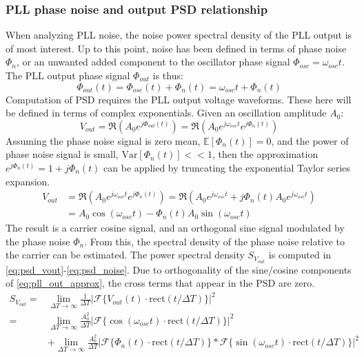 	\subsubsection{PLL phase noise and output PSD relationship}\label{pn_noise_psd}
		When analyzing PLL noise, the noise power spectral density of the PLL output is of most interest. Up to this point, noise has been defined in terms of phase noise $\Phi_{n}$, or an unwanted added component to the oscillator phase signal $\Phi_{osc}=\omega_{osc}t$. The PLL output phase signal $\Phi_{out}$ is thus:
		\begin{equation}
			\Phi_{out}(t) = \Phi_{osc}(t) + \Phi_{n}(t) = \omega_{osc}t + \Phi_{n}(t) 
		\end{equation}
		Computation of PSD requires the PLL output voltage waveforms. These here will be defined in terms of complex exponentials. Given an oscillation amplitude $A_0$:
		\begin{equation}
			V_{out} = \Re\left(A_0e^{j\Phi_{out}(t)}\right) = \Re\left(A_0e^{j\omega_{osc}t}e^{j\Phi_{n}(t)}\right)
		\end{equation}
		Assuming the phase noise signal is zero mean, $\mathbb{E}[\Phi_{n}(t)]=0$, and the power of phase noise signal is small, $\mathrm{Var}[\Phi_{n}(t)] << 1$, then the approximation $e^{j\Phi_{n}(t)} = 1 + j\Phi_{n}(t)$ can be applied by truncating the exponential Taylor series expansion.
		\begin{align}
			V_{out} &= \Re\left(A_0e^{j\omega_{osc}t}e^{j\Phi_{n}(t)}\right) = \Re\left(A_0e^{j\omega_{osc}t} +j\Phi_{n}(t)A_0e^{j\omega_{osc}t}\right)\\
			&= A_0\cos(\omega_{osc}t) - \Phi_{n}(t)A_0\sin(\omega_{osc}t) \label{eq:pll_out_approx}
		\end{align}
		The result is a carrier cosine signal, and an orthogonal sine signal modulated by the phase noise $\Phi_{n}$. From this, the spectral density of the phase noise relative to the carrier can be estimated. The power spectral density $S_{V_{out}}$ is computed in \ref{eq:psd_vout}-\ref{eq:psd_noise}. Due to orthogonality of the sine/cosine components of \ref{eq:pll_out_approx}, the cross terms that appear in the PSD are zero. 
		\begin{align}
			S_{V_{out}} =& \lim_{\Delta T\rightarrow\infty}\frac{1}{\Delta T}|\mathcal{F}\{V_{out}(t)\cdot\mathrm{rect}(t/\Delta T)\}|^2 \label{eq:psd_vout}\\
			=&\lim_{\Delta T\rightarrow\infty}\frac{A_0^2}{\Delta T}|\mathcal{F}\{\cos(\omega_{osc}t)\cdot\mathrm{rect}(t/\Delta T)\}|^2 \label{eq:psd_carrier}\\ 
			&+ \lim_{\Delta T\rightarrow\infty}\frac{A_0^2}{\Delta T}|\mathcal{F}\{\Phi_{n}(t)\cdot\mathrm{rect}(t/\Delta T)\}*\mathcal{F}\{\sin(\omega_{osc}t)\cdot\mathrm{rect}(t/\Delta T)\}|^2 \label{eq:psd_noise}
		\end{align}
